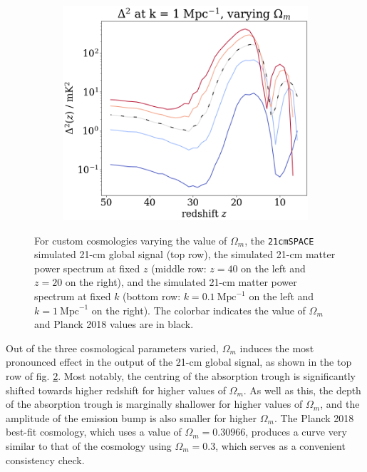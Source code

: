 \documentclass[floats,floatfix,showpacs,amssymb,prd,superscriptaddress,nofootinbib]{revtex4-2} %
\newcommand{\code}{\texttt}
\begin{document}
\begin{figure}[H]
\begin{subfigure}[b]{0.45\textwidth}
     \end{subfigure}
     \hfill
     \begin{subfigure}[b]{0.45\textwidth}
         \centering
         \includegraphics[width=\textwidth]{images/simulation_results/power_spectrum_fixed_k_1_Om.png}
         \label{fig:power_spectrum_fixed_k_1_Om}
     \end{subfigure}
        \caption{For custom cosmologies varying the value of $\Omega_m$, the \code{21cmSPACE} simulated 21-cm global signal (top row), the simulated 21-cm matter power spectrum at fixed $z$ (middle row: $z = 40$ on the left and $z = 20$ on the right), and the simulated 21-cm matter power spectrum at fixed $k$ (bottom row: $k = 0.1 ~\text{Mpc}^{-1}$ on the left and $k = 1 ~\text{Mpc}^{-1}$ on the right). The colorbar indicates the value of $\Omega_m$ and Planck 2018 values are in black.}
        \label{fig:simulation_results_Om}
\end{figure}


Out of the three cosmological parameters varied, $\Omega_m$ induces the most pronounced effect in the output of the 21-cm global signal, as shown in the top row of fig. \ref{fig:simulation_results_Om}. Most notably, the centring of the absorption trough is significantly shifted towards higher redshift for higher values of $\Omega_m$. As well as this, the depth of the absorption trough is marginally shallower for higher values of $\Omega_m$, and the amplitude of the emission bump is also smaller for higher $\Omega_m$. The Planck 2018 best-fit cosmology, which uses a value of $\Omega_m = 0.30966$, produces a curve very similar to that of the cosmology using $\Omega_m = 0.3$, which serves as a convenient consistency check. 
\end{document}
